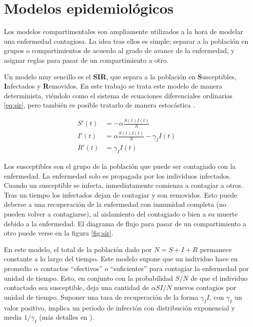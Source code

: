 

\section{Modelos epidemiológicos}\label{sec:epi-model}

Los modelos compartimentales son ampliamente utilizados a la hora de modelar una enfermedad contagiosa. La idea tras ellos es simple; separar a la población en grupos o compartimientos de acuerdo al grado de avance de la enfermedad, y asignar reglas para pasar de un compartimiento a otro.

Un modelo muy sencillo es el \textbf{SIR}, que separa a la población en \textbf{S}usceptibles, \textbf{I}nfectados y \textbf{R}emovidos. En este trabajo se trata este modelo de manera determinista, viéndolo como el sistema de ecuaciones diferenciales ordinarias \ref{eq:sir}, pero también es posible tratarlo de manera estocástica \cite{Daley1984}.

\begin{equation}
\label{eq:sir}
\begin{aligned}
S'(t) &=  -\alpha \frac{S(t)I(t)}{N} \\
I'(t) &= \alpha \frac{S(t)I(t)}{N}- \gamma_I I(t) \\
R'(t) &= \gamma_I I(t)
\end{aligned}
\end{equation}

Los susceptibles son el grupo de la población que puede ser contagiado con la enfermedad. La enfermedad solo es propagada por los individuos infectados. Cuando un susceptible se infecta, inmediatamente comienza a contagiar a otros. Tras un tiempo los infectados dejan de contagiar y son removidos. Esto puede deberse a una recuperación de la enfermedad con inmunidad completa (no pueden volver a contagiarse), al aislamiento del contagiado o bien a su muerte debido a la enfermedad. El diagrama de flujo para pasar de un compartimiento a otro puede verse en la figura \ref{fig:sir}.

En este modelo, el total de la población dado por \(N = S + I + R\) permanece constante a lo largo del tiempo. Este modelo supone que un individuo hace en promedio \(\alpha\) contactos  ``efectivos'' o ``suficientes'' para contagiar la enfermedad por unidad de tiempo. Esto, en conjunto con la probabilidad \(S/N\) de que el individuo contactado sea susceptible, deja una cantidad de \(\alpha S I / N\) nuevos contagios por unidad de tiempo. Suponer una tasa de recuperación de la forma \(\gamma_I I\), con \(\gamma_I\) un valor positivo, implica un periodo de infección con distribución exponencial y media \(1/\gamma_I\) (más detalles en \cite{Brauer2019}).




